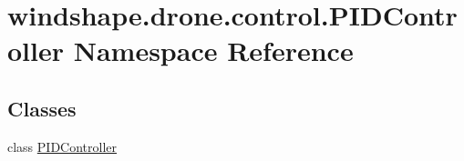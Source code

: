 \hypertarget{namespacewindshape_1_1drone_1_1control_1_1_p_i_d_controller}{}\section{windshape.\+drone.\+control.\+P\+I\+D\+Controller Namespace Reference}
\label{namespacewindshape_1_1drone_1_1control_1_1_p_i_d_controller}
\subsection*{Classes}
\begin{DoxyCompactItemize}
\item 
class \mbox{\hyperlink{classwindshape_1_1drone_1_1control_1_1_p_i_d_controller_1_1_p_i_d_controller}{P\+I\+D\+Controller}}
\end{DoxyCompactItemize}
